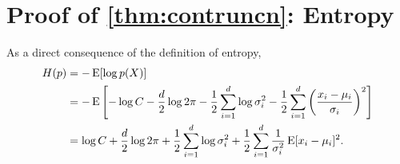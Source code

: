 \section{Proof of \cref{thm:contruncn}: Entropy}

As a direct consequence of the definition of entropy,
\begin{align*}
    H(p) 
    &= -\E [\log p(X)] \\
    &= -\E \left[-\log C - \half[d] \log 2\pi - \half \sum_{i=1}^d \log \sigma_i^2 - \half \sum_{i=1}^d \left( \frac{x_i - \mu_i}{\sigma_i} \right)^2 \right] \\
    &= \log C + \half[d] \log 2\pi + \half \sum_{i=1}^d \log \sigma_i^2 + \half \sum_{i=1}^d \frac{1}{\sigma_i^2} \E [ x_i - \mu_i ]^2.
\end{align*}

